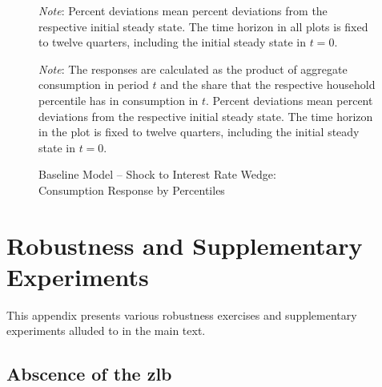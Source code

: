 \documentclass[a4paper,12pt]{article} %
\numberwithin{equation}{section} %
\numberwithin{figure}{section}
\numberwithin{table}{section}
\begin{document}
\begin{refsection}
\begin{appendices}
\begin{figure}[H]
     \vspace{10pt}

     \begin{flushleft}
     \footnotesize
	\textit{Note}: Percent deviations mean percent deviations from the respective initial steady state. The time horizon in all plots is fixed to twelve quarters, including the initial steady state in $t=0$.
	\end{flushleft}
\end{figure}

\begin{figure}[H]
    \centering
    \caption{Baseline Model -- Shock to Interest Rate Wedge: \\ Consumption Response by Percentiles}
    \label{fig:baseline-permanent-wedge-dist-c-response}
    
    
    \vspace{10pt}
    
    \begin{minipage}{0.75\textwidth} 
    \footnotesize
    \textit{Note}: The responses are calculated as the product of aggregate consumption in period $t$ and the share that the respective household percentile has in consumption in $t$. Percent deviations mean percent deviations from the respective initial steady state. The time horizon in the plot is fixed to twelve quarters, including the initial steady state in $t=0$.
    \end{minipage}
\end{figure}

\section{Robustness and Supplementary Experiments}
\label{sec-app:robust}

This appendix presents various robustness exercises and supplementary experiments alluded to in the main text.

\subsection{Abscence of the \Gls{zlb}}
\label{sec-app:robust-no-zlb}


\end{appendices}
\end{refsection}
\end{document}

